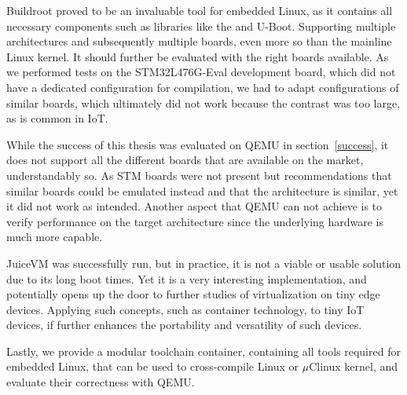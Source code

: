 Buildroot proved to be an invaluable tool for embedded Linux, as it contains all necessary components such as libraries like the  and U-Boot. Supporting multiple architectures and subsequently multiple boards, even more so than the mainline Linux kernel. It should further be evaluated with the right boards available. As we performed tests on the STM32L476G-Eval development board, which did not have a dedicated configuration for compilation, we had to adapt configurations of similar boards,  which ultimately did not work because the contrast was too large, as is common in IoT.

While the success of this thesis was evaluated on QEMU in section~\ref{success}, it does not support all the different boards that are available on the market, understandably so. As STM boards were not present but recommendations that similar boards could be emulated instead and that the architecture is similar, yet it did not work as intended. Another aspect that QEMU can not achieve is to verify performance on the target architecture since the underlying hardware is much more capable.

JuiceVM was successfully run, but in practice, it is not a viable or usable solution due to its long boot times. Yet it is a very interesting implementation, and potentially opens up the door to further studies of virtualization on tiny edge devices. Applying such concepts, such as container technology, to tiny IoT devices, if further enhances the portability and versatility of such devices.

Lastly, we provide a modular toolchain container, containing all tools required for embedded Linux, that can be used to cross-compile Linux or $\mu$Clinux kernel, and evaluate their correctness with QEMU.
